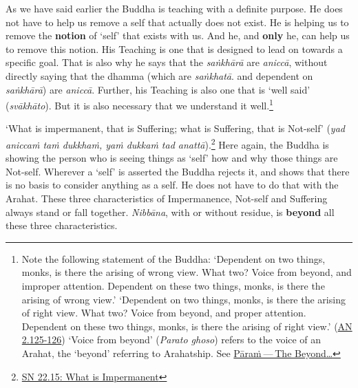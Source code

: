 As we have said earlier the Buddha is teaching with a definite purpose. He does not have to help us remove a self that actually does not exist. He is helping us to remove the \textbf{notion} of `self' that exists with us. And he, and \textbf{only} he, can help us to remove this notion. His Teaching is one that is designed to lead on towards a specific goal. That is also why he says that the \emph{saṅkhārā} are \emph{aniccā}, without directly saying that the dhamma (which are \emph{saṅkhatā}. and dependent on \emph{saṅkhārā}) are \emph{aniccā}. Further, his Teaching is also one that is `well said' (\emph{svākhāto}). But it is also necessary that we understand it well.\footnote{Note the following statement of the Buddha: `Dependent on two things, monks, is there the arising of wrong view. What two? Voice from beyond, and improper attention. Dependent on these two things, monks, is there the arising of wrong view.' `Dependent on two things, monks, is there the arising of right view. What two? Voice from beyond, and proper attention. Dependent on these two things, monks, is there the arising of right view.' (\href{https://suttacentral.net/an2.118-129/en/sujato}{AN 2.125-126}) `Voice from beyond' (\emph{Parato ghoso}) refers to the voice of an Arahat, the `beyond' referring to Arahatship. See \protect\hyperlink{beyond}{Pāraṁ --- The Beyond\ldots\hspace{0pt}}}

`What is impermanent, that is Suffering; what is Suffering, that is Not-self' (\emph{yad aniccaṁ taṁ dukkhaṁ, yaṁ dukkaṁ tad anattā}).\footnote{\href{https://suttacentral.net/sn22.15/en/bodhi}{SN 22.15: What is Impermanent}} Here again, the Buddha is showing the person who is seeing things as `self' how and why those things are Not-self. Wherever a `self' is asserted the Buddha rejects it, and shows that there is no basis to consider anything as a self. He does not have to do that with the Arahat. These three characteristics of Impermanence, Not-self and Suffering always stand or fall together. \emph{Nibbāna}, with or without residue, is \textbf{beyond} all these three characteristics.
